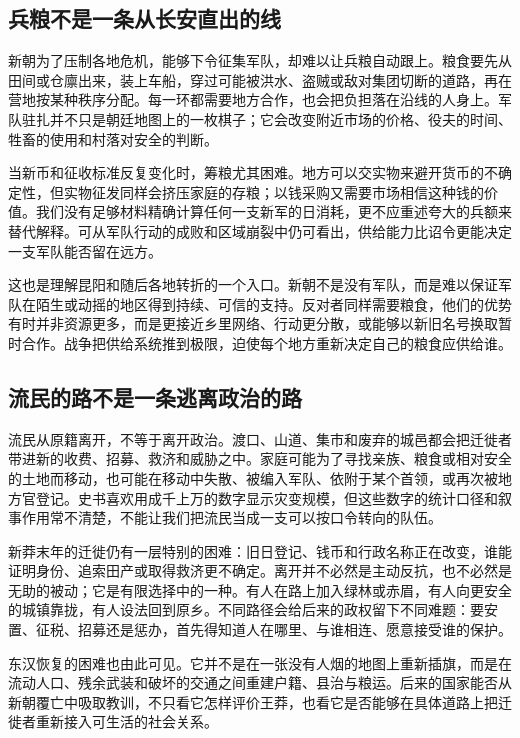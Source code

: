 \subsection{兵粮不是一条从长安直出的线}

新朝为了压制各地危机，能够下令征集军队，却难以让兵粮自动跟上。粮食要先从田间或仓廪出来，装上车船，穿过可能被洪水、盗贼或敌对集团切断的道路，再在营地按某种秩序分配。每一环都需要地方合作，也会把负担落在沿线的人身上。军队驻扎并不只是朝廷地图上的一枚棋子；它会改变附近市场的价格、役夫的时间、牲畜的使用和村落对安全的判断。

当新币和征收标准反复变化时，筹粮尤其困难。地方可以交实物来避开货币的不确定性，但实物征发同样会挤压家庭的存粮；以钱采购又需要市场相信这种钱的价值。我们没有足够材料精确计算任何一支新军的日消耗，更不应重述夸大的兵额来替代解释。可从军队行动的成败和区域崩裂中仍可看出，供给能力比诏令更能决定一支军队能否留在远方。

这也是理解昆阳和随后各地转折的一个入口。新朝不是没有军队，而是难以保证军队在陌生或动摇的地区得到持续、可信的支持。反对者同样需要粮食，他们的优势有时并非资源更多，而是更接近乡里网络、行动更分散，或能够以新旧名号换取暂时合作。战争把供给系统推到极限，迫使每个地方重新决定自己的粮食应供给谁。

\subsection{流民的路不是一条逃离政治的路}

流民从原籍离开，不等于离开政治。渡口、山道、集市和废弃的城邑都会把迁徙者带进新的收费、招募、救济和威胁之中。家庭可能为了寻找亲族、粮食或相对安全的土地而移动，也可能在移动中失散、被编入军队、依附于某个首领，或再次被地方官登记。史书喜欢用成千上万的数字显示灾变规模，但这些数字的统计口径和叙事作用常不清楚，不能让我们把流民当成一支可以按口令转向的队伍。

新莽末年的迁徙仍有一层特别的困难：旧日登记、钱币和行政名称正在改变，谁能证明身份、追索田产或取得救济更不确定。离开并不必然是主动反抗，也不必然是无助的被动；它是有限选择中的一种。有人在路上加入绿林或赤眉，有人向更安全的城镇靠拢，有人设法回到原乡。不同路径会给后来的政权留下不同难题：要安置、征税、招募还是惩办，首先得知道人在哪里、与谁相连、愿意接受谁的保护。

东汉恢复的困难也由此可见。它并不是在一张没有人烟的地图上重新插旗，而是在流动人口、残余武装和破坏的交通之间重建户籍、县治与粮运。后来的国家能否从新朝覆亡中吸取教训，不只看它怎样评价王莽，也看它是否能够在具体道路上把迁徙者重新接入可生活的社会关系。

